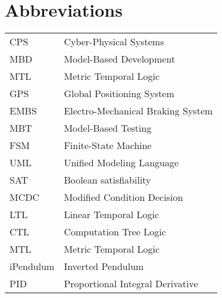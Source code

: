 \chapter*{Abbreviations}

\begin{tabular}{ll}
CPS & Cyber-Physical Systems\\
MBD & Model-Based Development\\
MTL & Metric Temporal Logic\\
GPS & Global Positioning System\\
EMBS & Electro-Mechanical Braking System\\
MBT & Model-Based Testing\\
FSM & Finite-State Machine\\
UML & Unified Modeling Language\\
SAT & Boolean satisfiability\\
MCDC & Modified Condition Decision\\
LTL &  Linear Temporal Logic\\
CTL & Computation Tree Logic\\
MTL & Metric Temporal Logic\\
iPendulum & Inverted Pendulum\\
PID & Proportional Integral Derivative
\end{tabular}